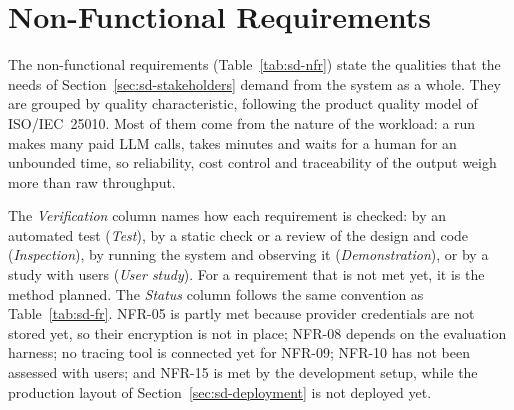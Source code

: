 \section{Non-Functional Requirements}
\label{sec:sd-nfr}

The non-functional requirements (Table~\ref{tab:sd-nfr}) state the qualities that the needs of Section~\ref{sec:sd-stakeholders} demand from the system as a whole. They are grouped by quality characteristic, following the product quality model of ISO/IEC~25010. Most of them come from the nature of the workload: a run makes many paid LLM calls, takes minutes and waits for a human for an unbounded time, so reliability, cost control and traceability of the output weigh more than raw throughput.

The \emph{Verification} column names how each requirement is checked: by an automated test (\emph{Test}), by a static check or a review of the design and code (\emph{Inspection}), by running the system and observing it (\emph{Demonstration}), or by a study with users (\emph{User study}). For a requirement that is not met yet, it is the method planned. The \emph{Status} column follows the same convention as Table~\ref{tab:sd-fr}. NFR-05 is partly met because provider credentials are not stored yet, so their encryption is not in place; NFR-08 depends on the evaluation harness; no tracing tool is connected yet for NFR-09; NFR-10 has not been assessed with users; and NFR-15 is met by the development setup, while the production layout of Section~\ref{sec:sd-deployment} is not deployed yet.

